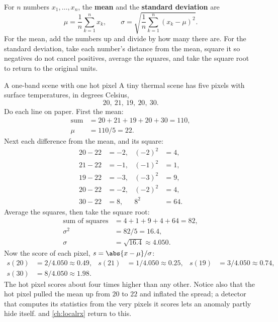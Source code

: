 \begin{definition}
For $n$ numbers $x_1, \dots, x_n$, the \textbf{mean} and the \textbf{standard deviation} are
\[ \mu = \frac{1}{n}\sum_{k=1}^{n} x_k, \qquad \sigma = \sqrt{\frac{1}{n}\sum_{k=1}^{n} (x_k - \mu)^2}. \]
For the mean, add the numbers up and divide by how many there are. For the standard deviation,
take each number's distance from the mean, square it so negatives do not cancel positives, average the squares, and take the square
root to return to the original units.
\end{definition}

\begin{worked}[label={we:problem:zscore}]{A one-band scene with one hot pixel}
A tiny thermal scene has five pixels with surface temperatures, in degrees Celsius,
\[ 20,\ 21,\ 19,\ 20,\ 30. \]
Do each line on paper. First the mean:
\begin{align*}
\text{sum} &= 20 + 21 + 19 + 20 + 30 = 110,\\
\mu &= 110 / 5 = 22.
\end{align*}
Next each difference from the mean, and its square:
\begin{align*}
20 - 22 &= -2, & (-2)^2 &= 4,\\
21 - 22 &= -1, & (-1)^2 &= 1,\\
19 - 22 &= -3, & (-3)^2 &= 9,\\
20 - 22 &= -2, & (-2)^2 &= 4,\\
30 - 22 &= 8,  & 8^2 &= 64.
\end{align*}
Average the squares, then take the square root:
\begin{align*}
\text{sum of squares} &= 4 + 1 + 9 + 4 + 64 = 82,\\
\sigma^2 &= 82/5 = 16.4,\\
\sigma &= \sqrt{16.4} \approx 4.050.
\end{align*}
Now the score of each pixel, $s = \abs{x-\mu}/\sigma$:
\begin{align*}
s(20) &= 2/4.050 \approx 0.49, & s(21) &= 1/4.050 \approx 0.25, & s(19) &= 3/4.050 \approx 0.74,\\
s(30) &= 8/4.050 \approx 1.98.
\end{align*}
The hot pixel scores about four times higher than any other. Notice also that the hot pixel
pulled the mean up from $20$ to $22$ and inflated the spread; a detector that computes its
statistics from the very pixels it scores lets an anomaly partly hide itself.  and
\cref{ch:localrx} return to this.
\end{worked}

